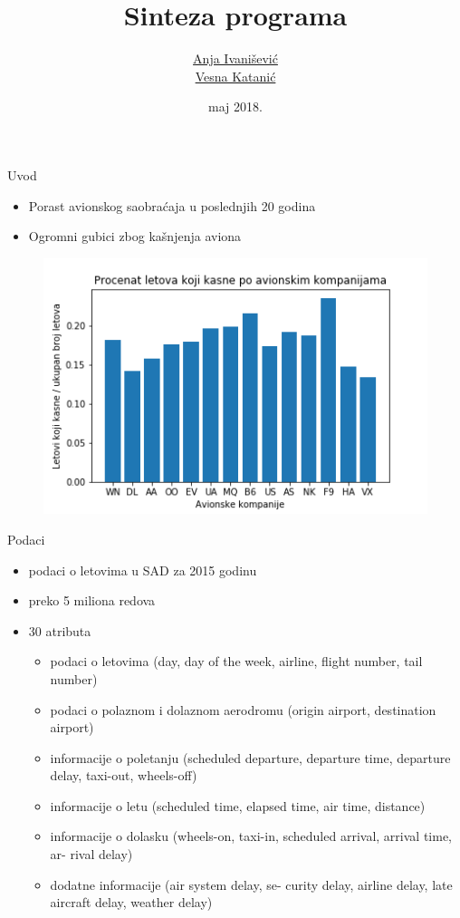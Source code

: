 \documentclass{beamer}
\title{Sinteza programa}
\author{\href{mailto:anja.ivanisevic95@gmail.com}{Anja Ivanišević}\\\href{mailto:vesna.katanic@gmail.com}{Vesna Katanić}}
\date{maj 2018.}
\begin{document}
\begin{frame}
    \titlepage
\end{frame}

\begin{frame}{Uvod}
    \begin{itemize}
        \item Porast avionskog saobraćaja u poslednjih 20 godina
        \item Ogromni gubici zbog kašnjenja aviona
    \end{itemize}
    \begin{figure}
        \begin{center}
            \includegraphics[scale=0.4]{slika1_n.png}
        \end{center}
    \end{figure}
\end{frame}


\begin{frame}{Podaci}
    \begin{itemize}
        \item podaci o letovima u SAD za 2015 godinu
        \item preko 5 miliona redova
        \item 30 atributa
        \begin{itemize}
                \item podaci o letovima (day, day of the
week, airline, flight number, tail number)
                \item podaci o polaznom i dolaznom aerodromu (origin airport, destination airport)
                \item informacije o poletanju (scheduled departure, departure time, departure delay, taxi-out, wheels-off)
                \item informacije o letu (scheduled time, elapsed time, air time, distance)
                \item informacije o dolasku (wheels-on,
taxi-in, scheduled arrival, arrival time, ar-
rival delay)
				\item dodatne informacije (air system delay, se-
curity delay, airline delay, late aircraft delay,
weather delay)
        \end{itemize}

    \end{itemize}
\end{frame}
\end{document}
